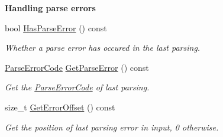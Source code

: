\begin{Indent}{\bf Handling parse errors}\par
\begin{DoxyCompactItemize}
\item 
bool \hyperlink{class_generic_document_afe0c87d9fc13a78597360e0646479419}{Has\+Parse\+Error} () const \hypertarget{class_generic_document_afe0c87d9fc13a78597360e0646479419}{}\label{class_generic_document_afe0c87d9fc13a78597360e0646479419}

\begin{DoxyCompactList}\small\item\em Whether a parse error has occured in the last parsing. \end{DoxyCompactList}\item 
\hyperlink{group___r_a_p_i_d_j_s_o_n___e_r_r_o_r_s_ga8d4b32dfc45840bca189ade2bbcb6ba7}{Parse\+Error\+Code} \hyperlink{class_generic_document_aab4771355aa3c6e5368da3ae36f38cc1}{Get\+Parse\+Error} () const \hypertarget{class_generic_document_aab4771355aa3c6e5368da3ae36f38cc1}{}\label{class_generic_document_aab4771355aa3c6e5368da3ae36f38cc1}

\begin{DoxyCompactList}\small\item\em Get the \hyperlink{group___r_a_p_i_d_j_s_o_n___e_r_r_o_r_s_ga8d4b32dfc45840bca189ade2bbcb6ba7}{Parse\+Error\+Code} of last parsing. \end{DoxyCompactList}\item 
size\+\_\+t \hyperlink{class_generic_document_a2db6ad11d157342f725470fb898b6712}{Get\+Error\+Offset} () const \hypertarget{class_generic_document_a2db6ad11d157342f725470fb898b6712}{}\label{class_generic_document_a2db6ad11d157342f725470fb898b6712}

\begin{DoxyCompactList}\small\item\em Get the position of last parsing error in input, 0 otherwise. \end{DoxyCompactList}\end{DoxyCompactItemize}
\end{Indent}
